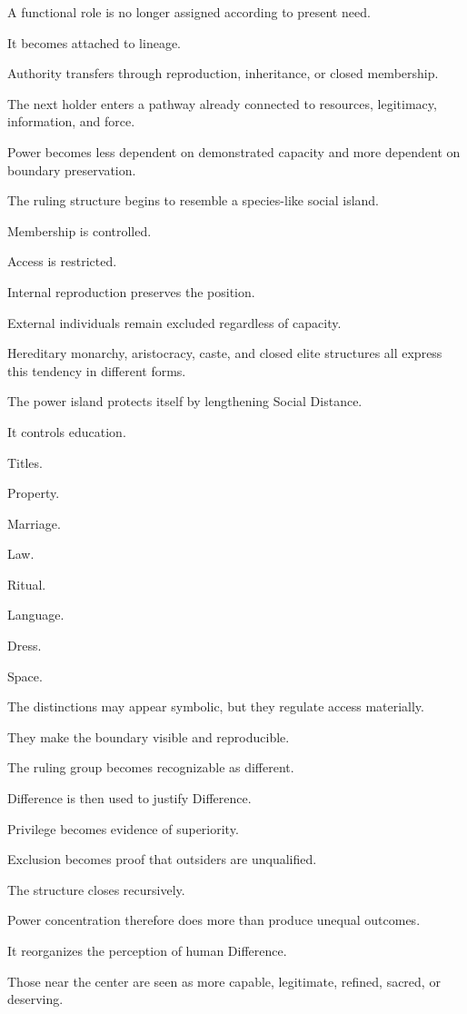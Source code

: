 A functional role is no longer assigned according to present need.

It becomes attached to lineage.

Authority transfers through reproduction, inheritance, or closed membership.

The next holder enters a pathway already connected to resources, legitimacy, information, and force.

Power becomes less dependent on demonstrated capacity and more dependent on boundary preservation.

The ruling structure begins to resemble a species-like social island.

Membership is controlled.

Access is restricted.

Internal reproduction preserves the position.

External individuals remain excluded regardless of capacity.

Hereditary monarchy, aristocracy, caste, and closed elite structures all express this tendency in different forms.

The power island protects itself by lengthening Social Distance.

It controls education.

Titles.

Property.

Marriage.

Law.

Ritual.

Language.

Dress.

Space.

The distinctions may appear symbolic, but they regulate access materially.

They make the boundary visible and reproducible.

The ruling group becomes recognizable as different.

Difference is then used to justify Difference.

Privilege becomes evidence of superiority.

Exclusion becomes proof that outsiders are unqualified.

The structure closes recursively.

Power concentration therefore does more than produce unequal outcomes.

It reorganizes the perception of human Difference.

Those near the center are seen as more capable, legitimate, refined, sacred, or deserving.

